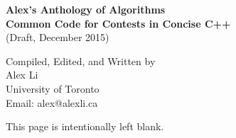 \begin{titlepage}
	\centering
	
	\vspace*{5 cm}
	
	\textbf{\LARGE Alex's Anthology of Algorithms}
	\\[1.0\baselineskip]
	\textbf{\Large Common Code for Contests in Concise C++}
	\\[1.0\baselineskip]
	{\Large (Draft, December 2015)}
	
	\vspace*{10 cm}
	
	{\large Compiled, Edited, and Written by}
	\\[0.5\baselineskip]
	{\Large Alex Li}
	\\[0.5\baselineskip]
	{\large University of Toronto}
	\\[0.5\baselineskip]
	{\large Email: alex@alexli.ca}
\end{titlepage}

\vspace*{7 cm}
\centering

{\large This page is intentionally left blank.}

\vspace{\fill}
\makeatletter
